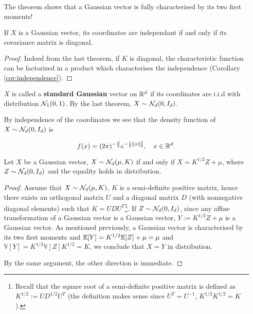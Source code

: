 \documentclass{article}
\begin{document}
The theorem shows that a Gaussian vector is fully characterised by its two first
moments!

\begin{corollary}
  If $X$ is a Gaussian vector, its coordinates are independant if and only if
  its covariance matrix is diagonal. 
\end{corollary}

\begin{proof}
  Indeed from the last theorem, if $K$ is diagonal, the characteristic function can be
  factorized in a product which characterises the independence (Corollary \ref{cor:independence}). 
\end{proof}

\begin{definition}
  $X$ is called a \textbf{standard Gaussian} vector on $\mathbb{R}^{d}$ if its coordinates are i.i.d with distribution
  $\mathcal{N}_1(0,1)$. By the last theorem,  $X \sim \mathcal{N}_d(0,I_d)$.
\end{definition}

By independence of the coordinates we see that the
density function of $X \sim \mathcal{N}_d(0,I_d)$ is

$$f(x)=(2 \pi)^{-\frac{d}{2}} e^{-\frac{1}{2}\|x\|_2^{2}}, \quad x \in \mathbb{R}^{d}.$$

\begin{theorem}
  Let $X$ be a Gaussian vector, $X \sim \mathcal{N}_d(\mu,K)$ if and only if $X =
  K^{1/2}Z + \mu$, where $Z \sim \mathcal{N}_d(0,I_d)$ and the equality holds in
  distribution. 
\end{theorem}

\begin{proof} Assume that $X \sim \mathcal{N}_d(\mu,K)$, $K$ is a semi-definite positive matrix,
  hence there exists an orthogonal matrix $U$ and a diagonal matrix $D$ (with nonnegative diagonal
  elements) such that $K = UDU^T$\footnote{Recall that the square root of a
  semi-definite positive matrix is defined as $K^{1/2}:= UD^{1/2}U^T$ (the
  definition makes sense since $U^T = U^{-1}$, $K^{1/2}K^{1/2} = K$).}. If $Z
\sim \mathcal{N}_d(0,I_d)$, since any affine transformation of a
  Gaussian vector is a Gaussian vector, $Y:= K^{1/2}Z + \mu$ is a
  Gaussian vector. As mentioned previously, a Gaussian vector is characterised
  by its two first moments and $\mathbb{E}[Y] =K^{1/2}\mathbb{E}[Z]+\mu = \mu$ and $\mathbb{V}[Y] =
  K^{1/2}\mathbb{V}[Z]K^{1/2} = K$, we conclude that $X=Y$ in distribution.

  By the same argument, the other direction is immediate. 
\end{proof}
\end{document}
